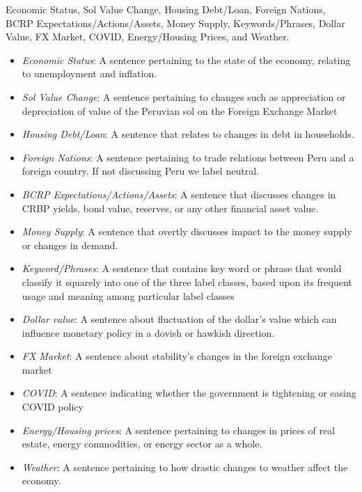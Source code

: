  Economic Status, Sol Value Change, Housing Debt/Loan, Foreign Nations, BCRP Expectations/Actions/Assets, Money Supply, Keywords/Phrases, Dollar Value, FX Market, COVID, Energy/Housing Prices, and Weather.

\begin{itemize}
    \item \emph{Economic Status}: A sentence pertaining to the state of the economy, relating to unemployment and inflation.
    \item \emph{Sol Value Change}: A sentence pertaining to changes such as appreciation or depreciation of value of the Peruvian sol on the Foreign Exchange Market
    \item \emph{Housing Debt/Loan}:  A sentence that relates to changes in debt in households.
    \item \emph{Foreign Nations}: A sentence pertaining to trade relations between Peru and a foreign country. If not discussing Peru we label neutral. 
    \item \emph{BCRP Expectations/Actions/Assets}: A sentence that discusses changes in CRBP yields, bond value, reserves, or any other financial asset value. 
    \item \emph{Money Supply}:  A sentence that overtly discusses impact to the money supply or changes in demand. 
    \item \emph{Keyword/Phrases}: A sentence that contains key word or phrase that would classify it squarely into one of the three label classes, based upon its frequent usage and meaning among particular label classes
    \item \emph{Dollar value}:  A sentence about fluctuation of the dollar’s value which can influence monetary policy in a dovish or hawkish direction.
    \item \emph{FX Market}: A sentence about stability’s changes in the foreign exchange market
    \item \emph{COVID}:  A sentence indicating whether the government is tightening or easing COVID policy
    \item \emph{Energy/Housing prices}: A sentence pertaining to changes in prices of real estate, energy commodities, or energy sector as a whole. 
    \item \emph{Weather}: A sentence pertaining to how drastic changes to weather affect the economy.
\end{itemize}

